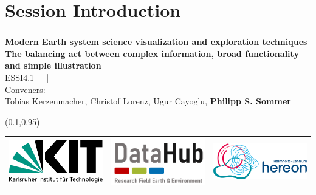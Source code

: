 
\section{Session Introduction} \label{sec:session-intro}

\begin{frame}
	\frametitle[Session title page]{}
	\begin{center}
		{\color{black}
			\textbf{
				\fontsize{36pt}{38pt}\selectfont Modern Earth system science visualization and exploration techniques\\
				\vspace{1.5cm}}}
		\textbf{
			\fontsize{26pt}{28pt}\selectfont The balancing act between complex information, broad functionality and simple illustration \\
		}
		\vspace{1em}
		{\fontsize{18pt}{20pt}\selectfont
            ESSI4.1 | \location \, | \presentationdate \\
			\vspace{1em}
			Conveners: \\
            Tobias Kerzenmacher, Christof Lorenz, Ugur Cayoglu, \textbf{Philipp S. Sommer}}

	\end{center}

    \begin{textblock*}{\textwidth}(0.1\textwidth,0.95\textheight)
        \begin{tabular}{p{}p{}p{}}
            \href{https://kit.edu}{\includegraphics[width=5cm]{figures/kit.pdf}} &
            \href{https://datahub.erde-und-umwelt.de}{\includegraphics[width=5cm]{figures/datahub.png}} &
            \hyperlink{frm:map}{\includegraphics[width=5cm]{figures/hereon.png}}
        \end{tabular}
    \end{textblock*}
\end{frame}

